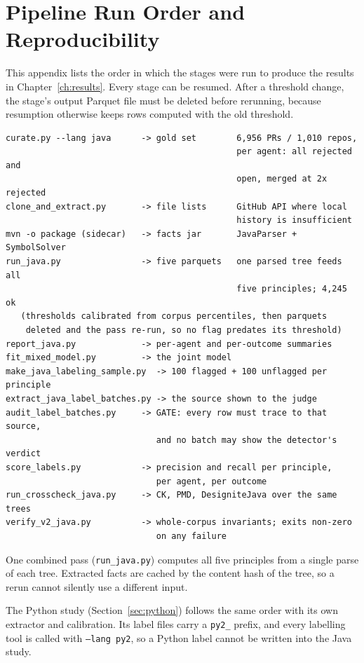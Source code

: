 \chapter{Pipeline Run Order and Reproducibility}
\label{app:pipeline}

This appendix lists the order in which the stages were run to produce the results in
Chapter~\ref{ch:results}. Every stage can be resumed. After a threshold change, the stage's output
Parquet file must be deleted before rerunning, because resumption otherwise keeps rows computed with
the old threshold.

\footnotesize
\begin{verbatim}
curate.py --lang java      -> gold set        6,956 PRs / 1,010 repos,
                                              per agent: all rejected and
                                              open, merged at 2x rejected
clone_and_extract.py       -> file lists      GitHub API where local
                                              history is insufficient
mvn -o package (sidecar)   -> facts jar       JavaParser + SymbolSolver
run_java.py                -> five parquets   one parsed tree feeds all
                                              five principles; 4,245 ok
   (thresholds calibrated from corpus percentiles, then parquets
    deleted and the pass re-run, so no flag predates its threshold)
report_java.py             -> per-agent and per-outcome summaries
fit_mixed_model.py         -> the joint model
make_java_labeling_sample.py  -> 100 flagged + 100 unflagged per principle
extract_java_label_batches.py -> the source shown to the judge
audit_label_batches.py     -> GATE: every row must trace to that source,
                              and no batch may show the detector's verdict
score_labels.py            -> precision and recall per principle,
                              per agent, per outcome
run_crosscheck_java.py     -> CK, PMD, DesigniteJava over the same trees
verify_v2_java.py          -> whole-corpus invariants; exits non-zero
                              on any failure
\end{verbatim}
\normalsize

One combined pass (\texttt{run\_java.py}) computes all five principles from a single parse of each
tree. Extracted facts are cached by the content hash of the tree, so a rerun cannot silently use a
different input.

The Python study (Section~\ref{sec:python}) follows the same order with its own extractor and
calibration. Its label files carry a \texttt{py2\_} prefix, and every labelling tool is called with
\texttt{--lang py2}, so a Python label cannot be written into the Java study.

